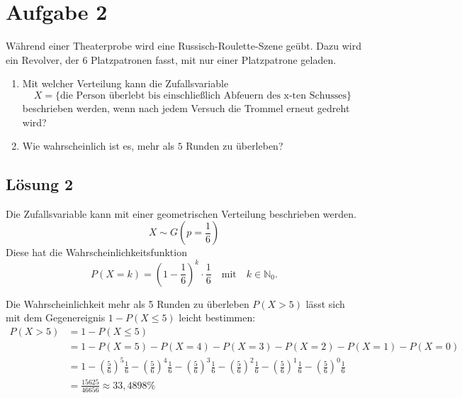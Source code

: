 \documentclass[main.tex]{subfiles}
\begin{document}
\section{Aufgabe 2}
Während einer Theaterprobe wird eine Russisch-Roulette-Szene geübt. Dazu wird ein Revolver, der $6$ Platzpatronen fasst, mit nur einer Platzpatrone geladen.
\begin{enumerate}
\item Mit welcher Verteilung kann die Zufallsvariable
 $$X = \{ \mbox{die Person überlebt bis einschließlich Abfeuern des x-ten Schusses} \}$$
 beschrieben werden, wenn nach jedem Versuch die Trommel erneut gedreht wird?
\item Wie wahrscheinlich ist es, mehr als $5$ Runden zu überleben?
\end{enumerate}

\subsection{Lösung 2}
Die Zufallsvariable kann mit einer geometrischen Verteilung beschrieben werden. $$
    X\sim G\left(p=\frac{1}{6}\right)
$$
Diese hat die Wahrscheinlichkeitsfunktion $$
    P(X{=}k) = \left(1-\frac{1}{6}\right)^k\cdot \frac{1}{6}
    \quad\text{mit}\quad k\in\mathbb{N}_0.
$$

Die Wahrscheinlichkeit mehr als 5 Runden zu überleben $P(X>5)$ lässt sich mit dem Gegenereignis $1 - P(X\leq 5)$ leicht bestimmen:
$$\begin{aligned}    
    P(X>5) &= 1 - P(X\leq 5) \\
    &= 1 - P(X{=}5) - P(X{=}4) - P(X{=}3) - P(X{=}2) - P(X{=}1) - P(X{=}0) \\[2mm]
    &= 1
    - \left(\frac{5}{6}\right)^5 \frac{1}{6}
    - \left(\frac{5}{6}\right)^4 \frac{1}{6}
    - \left(\frac{5}{6}\right)^3 \frac{1}{6}
    - \left(\frac{5}{6}\right)^2 \frac{1}{6}
    - \left(\frac{5}{6}\right)^1 \frac{1}{6}
    - \left(\frac{5}{6}\right)^0 \frac{1}{6} \\[2mm]
    &= \frac{15625}{46656} \approx 33,4898 \% \\
\end{aligned}$$
\end{document}
